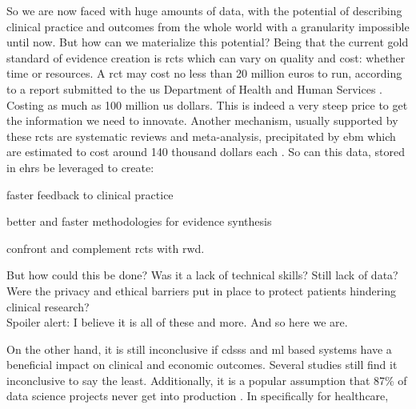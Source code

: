 So we are now faced with huge amounts of data, with the potential of describing clinical practice and outcomes from the whole world with a granularity impossible until now. But how can we materialize this potential?
Being that the current gold standard of evidence creation is \acp{rct} which can vary on quality and cost: whether time or resources. A \ac{rct} may cost no less than 20 million euros to run, according to a report submitted to the \ac{us} Department of Health and Human Services \cite{sertkayaaylinEXAMINATIONCLINICALTRIAL2014}. Costing as much as 100 million \ac{us} dollars. This is indeed a very steep price to get the information we need to innovate.
Another mechanism, usually supported by these \acp{rct} are systematic reviews and meta-analysis, precipitated by \ac{ebm} which are estimated to cost around 140 thousand dollars each \cite{michelsonSignificantCostSystematic2019}.
So can this data, stored in \acp{ehr} be leveraged to create:
\begin{myitemize}
    \item faster feedback to clinical practice
    \item better and faster methodologies for evidence synthesis
    \item confront and complement \acp{rct} with \ac{rwd}.
\end{myitemize}
But how could this be done? Was it a lack of technical skills? Still lack of data? Were the privacy and ethical barriers put in place to protect patients hindering clinical research? \\
Spoiler alert: I believe it is all of these and more. And so here we are.







On the other hand, it is still inconclusive if \acp{cdss} and \ac{ml} based systems have a beneficial impact on clinical and economic outcomes. Several studies still find it inconclusive \cite{muhiyaddinImpactClinicalDecision2020,kilsdonkFactorsInfluencingImplementation2017,muhiyaddinImpactClinicalDecision2020} to say the least.
Additionally, it is a popular assumption that 87\% of data science projects never get into production \cite{Why87Data2019}. In specifically for healthcare, 

